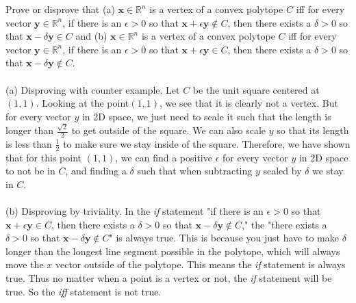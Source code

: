 \documentclass[12pt]{article}
\newenvironment{exercise}[2][Exercise]{\begin{trivlist}
\item[\hskip \labelsep {\bfseries #1}\hskip \labelsep {\bfseries #2.}]}{\end{trivlist}}
\begin{document}
\begin{exercise}{4} Prove or disprove that (a) $\mathbf{x} \in \mathbb{R}^n$ is a vertex of a convex polytope $C$ iff for every vector $\mathbf{y} \in \mathbb{R}^n$, if there is an $\epsilon > 0$ so that $\mathbf{x} + \epsilon \mathbf{y} \not \in C$, then there exists a $\delta > 0$ so that $\mathbf{x} - \delta \mathbf{y} \in C$ and (b) $\mathbf{x} \in \mathbb{R}^n$ is a vertex of a convex polytope $C$ iff for every vector $\mathbf{y} \in \mathbb{R}^n$, if there is an $\epsilon > 0$ so that $\mathbf{x} + \epsilon \mathbf{y} \in C$, then there exists a $\delta > 0$ so that $\mathbf{x} - \delta \mathbf{y} \not \in C$.\\\\
(a) Disproving with counter example. Let $C$ be the unit square centered at $(1,1)$. Looking at the point$(1,1)$, we see that it is clearly not a vertex. But for every vector $y$ in 2D space, we just need to scale it such that the length is longer than $\frac{\sqrt{2}}{2}$ to get outside of the square. We can also scale $y$ so that its length is less than $\frac{1}{2}$ to make sure we stay inside of the square. Therefore, we have shown that for this point $(1,1)$, we can find a positive $\epsilon$ for every vector $y$ in 2D space to not be in $C$, and finding a $\delta$ such that when subtracting $y$ scaled by $\delta$ we stay in $C$.\\\\
(b) Disproving by triviality. In the \emph{if} statement "if there is an $\epsilon > 0$ so that $\mathbf{x} + \epsilon \mathbf{y} \in C$, then there exists a $\delta > 0$ so that $\mathbf{x} - \delta \mathbf{y} \not \in C$," the "there exists a $\delta > 0$ so that $\mathbf{x} - \delta \mathbf{y} \not \in C$" is always true. This is because you just have to make $\delta$ longer than the longest line segment possible in the polytope, which will always move the $x$ vector outside of the polytope. This means the \emph{if} statement is always true. Thus no matter when a point is a vertex or not, the \emph{if} statement will be true. So the \emph{iff} statement is not true.
\end{exercise}
\end{document}
